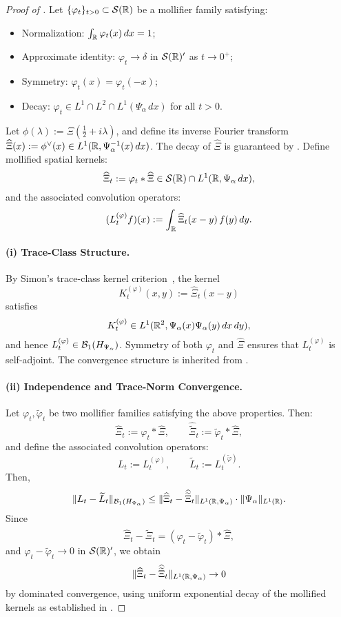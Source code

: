 \begin{proof}[Proof of ]
Let \( \{\varphi_t\}_{t > 0} \subset \mathcal{S}(\mathbb{R}) \) be a mollifier family satisfying:
\begin{itemize}
  \item Normalization: \( \int_{\mathbb{R}} \varphi_t(x)\, dx = 1 \);
  \item Approximate identity: \( \varphi_t \to \delta \) in \( \mathcal{S}(\mathbb{R})' \) as \( t \to 0^+ \);
  \item Symmetry: \( \varphi_t(x) = \varphi_t(-x) \);
  \item Decay: \( \varphi_t \in L^1 \cap L^2 \cap L^1(\Psi_\alpha\, dx) \) for all \( t > 0 \).
\end{itemize}

Let \( \phi(\lambda) := \Xi\left( \tfrac{1}{2} + i\lambda \right) \), and define its inverse Fourier transform \( \widehat{\Xi}(x) := \phi^\vee(x) \in L^1(\mathbb{R}, \Psi_\alpha^{-1}(x)\, dx) \). The decay of \( \widehat{\Xi} \) is guaranteed by . Define mollified spatial kernels:
\[
\widehat{\Xi}_t := \varphi_t * \widehat{\Xi} \in \mathcal{S}(\mathbb{R}) \cap L^1(\mathbb{R}, \Psi_\alpha\, dx),
\]
and the associated convolution operators:
\[
(L_t^{(\varphi)} f)(x) := \int_{\mathbb{R}} \widehat{\Xi}_t(x - y)\, f(y)\, dy.
\]

\paragraph{(i) Trace-Class Structure.}  
By Simon’s trace-class kernel criterion~\cite[Thm.~4.2]{Simon2005TraceIdeals}, the kernel
\[
K_t^{(\varphi)}(x, y) := \widehat{\Xi}_t(x - y)
\]
satisfies
\[
K_t^{(\varphi)} \in L^1(\mathbb{R}^2, \Psi_\alpha(x) \Psi_\alpha(y)\, dx\, dy),
\]
and hence \( L_t^{(\varphi)} \in \mathcal{B}_1(H_{\Psi_\alpha}) \). Symmetry of both \( \varphi_t \) and \( \widehat{\Xi} \) ensures that \( L_t^{(\varphi)} \) is self-adjoint. The convergence structure is inherited from .

\paragraph{(ii) Independence and Trace-Norm Convergence.}  
Let \( \varphi_t, \tilde{\varphi}_t \) be two mollifier families satisfying the above properties. Then:
\[
\widehat{\Xi}_t := \varphi_t * \widehat{\Xi}, \qquad \widehat{\widetilde{\Xi}}_t := \tilde{\varphi}_t * \widehat{\Xi},
\]
and define the associated convolution operators:
\[
L_t := L_t^{(\varphi)}, \qquad \widetilde{L}_t := L_t^{(\tilde{\varphi})}.
\]
Then,
\[
\| L_t - \widetilde{L}_t \|_{\mathcal{B}_1(H_{\Psi_\alpha})}
\le \| \widehat{\Xi}_t - \widehat{\widetilde{\Xi}}_t \|_{L^1(\mathbb{R}, \Psi_\alpha)} \cdot \| \Psi_\alpha \|_{L^1(\mathbb{R})}.
\]
Since
\[
\widehat{\Xi}_t - \widehat{\widetilde{\Xi}}_t = (\varphi_t - \tilde{\varphi}_t) * \widehat{\Xi},
\]
and \( \varphi_t - \tilde{\varphi}_t \to 0 \) in \( \mathcal{S}(\mathbb{R})' \), we obtain
\[
\| \widehat{\Xi}_t - \widehat{\widetilde{\Xi}}_t \|_{L^1(\mathbb{R}, \Psi_\alpha)} \to 0
\]
by dominated convergence, using uniform exponential decay of the mollified kernels as established in .


\end{proof}
